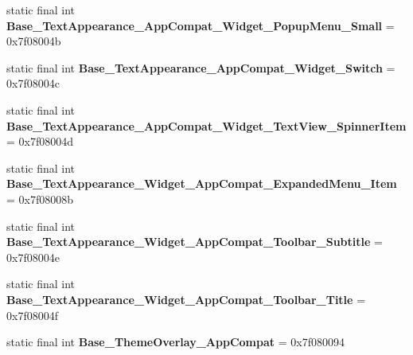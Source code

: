 \begin{DoxyCompactItemize}
\item 
\hypertarget{classandroid_1_1support_1_1design_1_1_r_1_1style_a5a039a7fe6bfb5737ea3ab4db879e191}{}static final int {\bfseries Base\+\_\+\+Text\+Appearance\+\_\+\+App\+Compat\+\_\+\+Widget\+\_\+\+Popup\+Menu\+\_\+\+Small} = 0x7f08004b\label{classandroid_1_1support_1_1design_1_1_r_1_1style_a5a039a7fe6bfb5737ea3ab4db879e191}

\item 
\hypertarget{classandroid_1_1support_1_1design_1_1_r_1_1style_a0fbdc925b35d8ab7f73a1b63ffe619c2}{}static final int {\bfseries Base\+\_\+\+Text\+Appearance\+\_\+\+App\+Compat\+\_\+\+Widget\+\_\+\+Switch} = 0x7f08004c\label{classandroid_1_1support_1_1design_1_1_r_1_1style_a0fbdc925b35d8ab7f73a1b63ffe619c2}

\item 
\hypertarget{classandroid_1_1support_1_1design_1_1_r_1_1style_a0716f65966220a21fc073fb525e91797}{}static final int {\bfseries Base\+\_\+\+Text\+Appearance\+\_\+\+App\+Compat\+\_\+\+Widget\+\_\+\+Text\+View\+\_\+\+Spinner\+Item} = 0x7f08004d\label{classandroid_1_1support_1_1design_1_1_r_1_1style_a0716f65966220a21fc073fb525e91797}

\item 
\hypertarget{classandroid_1_1support_1_1design_1_1_r_1_1style_a4268c80f559de038c8cece74dae902c0}{}static final int {\bfseries Base\+\_\+\+Text\+Appearance\+\_\+\+Widget\+\_\+\+App\+Compat\+\_\+\+Expanded\+Menu\+\_\+\+Item} = 0x7f08008b\label{classandroid_1_1support_1_1design_1_1_r_1_1style_a4268c80f559de038c8cece74dae902c0}

\item 
\hypertarget{classandroid_1_1support_1_1design_1_1_r_1_1style_a31d10ebb57d33a7aa2b3125aa2370409}{}static final int {\bfseries Base\+\_\+\+Text\+Appearance\+\_\+\+Widget\+\_\+\+App\+Compat\+\_\+\+Toolbar\+\_\+\+Subtitle} = 0x7f08004e\label{classandroid_1_1support_1_1design_1_1_r_1_1style_a31d10ebb57d33a7aa2b3125aa2370409}

\item 
\hypertarget{classandroid_1_1support_1_1design_1_1_r_1_1style_a2c616fade1ea43a6d49ebe1f3353f781}{}static final int {\bfseries Base\+\_\+\+Text\+Appearance\+\_\+\+Widget\+\_\+\+App\+Compat\+\_\+\+Toolbar\+\_\+\+Title} = 0x7f08004f\label{classandroid_1_1support_1_1design_1_1_r_1_1style_a2c616fade1ea43a6d49ebe1f3353f781}

\item 
\hypertarget{classandroid_1_1support_1_1design_1_1_r_1_1style_a19e25d7536a593b72a1d1faffc55770e}{}static final int {\bfseries Base\+\_\+\+Theme\+Overlay\+\_\+\+App\+Compat} = 0x7f080094\label{classandroid_1_1support_1_1design_1_1_r_1_1style_a19e25d7536a593b72a1d1faffc55770e}


\end{DoxyCompactItemize}
